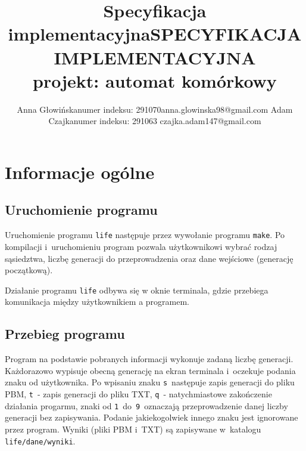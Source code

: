 \documentclass[a4paper,12pt,oneside]{article}
\begin{document}
\makeatother

\title{Specyfikacja implementacyjna}

\title{SPECYFIKACJA IMPLEMENTACYJNA\\projekt: automat komórkowy}

\author{Anna Głowińska\newline numer indeksu: 291070\newline anna.glowinska98@gmail.com \newline \newline
Adam Czajka\newline numer indeksu: 291063 \newline czajka.adam147@gmail.com}

\maketitle
\tableofcontents
\thispagestyle{fancy}
\newpage

\section{Informacje ogólne}

\subsection{Uruchomienie programu}
Uruchomienie programu \verb+life+ następuje przez wywołanie programu \verb+make+. Po kompilacji i~uruchomieniu program pozwala użytkownikowi wybrać rodzaj sąsiedztwa, liczbę generacji do przeprowadzenia oraz dane wejściowe (generację początkową).
\par Działanie programu \verb+life+ odbywa się w oknie terminala, gdzie przebiega komunikacja między użytkownikiem a programem.


\subsection{Przebieg programu}
Program na podstawie pobranych informacji wykonuje zadaną liczbę generacji. Każdorazowo wypisuje obecną generację na ekran terminala i~oczekuje podania znaku od użytkownika. Po wpisaniu znaku \verb+s+~następuje zapis generacji do pliku PBM, \verb+t+~- zapis generacji do pliku TXT, \verb+q+~- natychmiastowe zakończenie działania progarmu, znaki od \verb+1+~do~\verb+9+~oznaczają przeprowadzenie danej liczby generacji bez zapisywania. Podanie jakiekogolwiek innego znaku jest ignorowane przez program. Wyniki (pliki PBM i~TXT) są zapisywane w~katalogu \verb+life/dane/wyniki+.
\end{document}
